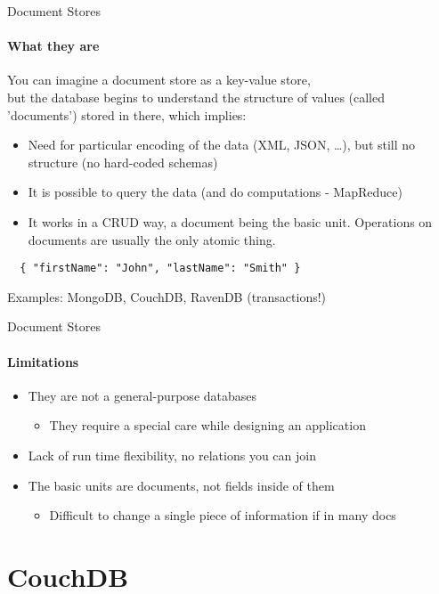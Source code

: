 \documentclass{beamer}
\begin{document}
\begin{frame}[fragile]{Document Stores}
  \framesubtitle{What they are}
  You can imagine a document store as a key-value store,\\but the database begins
  to understand the structure of values (called 'documents') stored in there,
  which implies:
  \begin{itemize}
    \item Need for particular encoding of the data (XML, JSON, \ldots),
          but still no structure (no hard-coded schemas)
    \item It is possible to query the data (and do computations - MapReduce)
    \item It works in a CRUD way, a document being the basic unit.
          Operations on documents are usually the only atomic thing.
  \end{itemize}
  \fontsize{8}{10}\selectfont
  \begin{verbatim}
  { "firstName": "John", "lastName": "Smith" }
  \end{verbatim}
  Examples: MongoDB, \alert<2>{CouchDB}, RavenDB (transactions!)
\end{frame}

\begin{frame}{Document Stores}
  \framesubtitle{Limitations}
  \begin{itemize}
    \item They are not a general-purpose databases
    \begin{itemize}
      \item They require a special care while designing an application
    \end{itemize}
    \item Lack of run time flexibility, no relations you can join
    \item The basic units are documents, not fields inside of them
    \begin{itemize}
      \item Difficult to change a single piece of information if in many docs
    \end{itemize}
  \end{itemize}
\end{frame}

\section{CouchDB}
\end{document}
